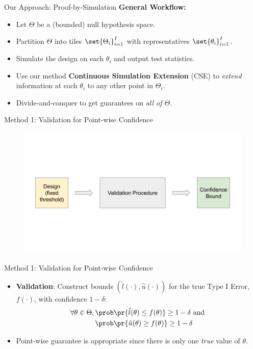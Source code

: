 \begin{frame}{Our Approach: Proof-by-Simulation}
\textbf{General Workflow:}
\begin{itemize}
    \item Let $\Theta$ be a (bounded) null hypothesis space.
    \item Partition $\Theta$ into tiles $\set{\Theta_i}_{i=1}^I$ 
        with representatives $\set{\theta_i}_{i=1}^I$.
    \item Simulate the design on each $\theta_i$ and output test statistics.
    \item Use our method \textbf{Continuous Simulation Extension} (CSE) to 
        \emph{extend} information at each $\theta_i$ to any other point in $\Theta_i$.
    \item Divide-and-conquer to get guarantees on \emph{all of $\Theta$}.
\end{itemize}
\end{frame}

\begin{frame}{Method 1: Validation for Point-wise Confidence}
\begin{figure}
    \centering
    \includegraphics[width=\linewidth]{figs/validation_scheme.png}
\end{figure}
\end{frame}

\begin{frame}{Method 1: Validation for Point-wise Confidence}
\begin{itemize}
    \item \textbf{Validation}: 
        Construct bounds $(\hat{l}(\cdot), \hat{u}(\cdot))$
        for the true Type I Error, $f(\cdot)$, with confidence $1-\delta$:
        \begin{align*}
            \forall \theta \in \Theta ,\, 
            &\prob\pr{\hat{l}(\theta) \leq f(\theta)} \geq 1-\delta \text{ and } \\
            &\prob\pr{\hat{u}(\theta) \geq f(\theta)} \geq 1-\delta
        \end{align*}
    \item Point-wise guarantee is appropriate since 
        there is only one \emph{true} value of $\theta$.
\end{itemize} 
\end{frame}

